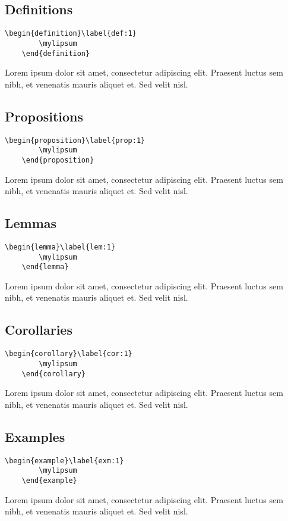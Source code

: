 \documentclass{article}
\newcommand{\mylipsum}{Lorem ipsum dolor sit amet, consectetur adipiscing elit. Praesent luctus sem nibh, et venenatis mauris aliquet et. Sed velit nisl.}
\begin{document}
	\subsection{Definitions}
	\begin{Verbatim}[tabsize=4]
	\begin{definition}\label{def:1}
		\mylipsum
	\end{definition}
	\end{Verbatim}
	\begin{definition}\label{def:1}
		\mylipsum
	\end{definition}

	\subsection{Propositions}
	\begin{Verbatim}[tabsize=4]
	\begin{proposition}\label{prop:1}
		\mylipsum
	\end{proposition}
	\end{Verbatim}
	\begin{proposition}\label{prop:1}
		\mylipsum
	\end{proposition}

	\subsection{Lemmas}
	\begin{Verbatim}[tabsize=4]
	\begin{lemma}\label{lem:1}
		\mylipsum
	\end{lemma}
	\end{Verbatim}
	\begin{lemma}\label{lem:1}
		\mylipsum
	\end{lemma}

	\subsection{Corollaries}
	\begin{Verbatim}[tabsize=4]
	\begin{corollary}\label{cor:1}
		\mylipsum
	\end{corollary}
	\end{Verbatim}
	\begin{corollary}\label{cor:1}
		\mylipsum
	\end{corollary}

	\subsection{Examples}
	\begin{Verbatim}[tabsize=4]
	\begin{example}\label{exm:1}
		\mylipsum
	\end{example}
	\end{Verbatim}
	\begin{example}\label{exm:1}
		\mylipsum
	\end{example}
\end{document}
